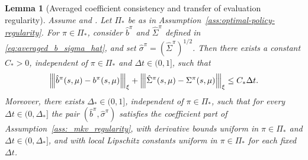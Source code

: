 \documentclass[a4paper, 10pt, english, reqno]{amsart}
\newcommand{\tnorm}[1]{\left\vert\kern-0.25ex\left\vert\kern-0.25ex\left\vert #1
\right\vert\kern-0.25ex\right\vert\kern-0.25ex\right\vert}
\newtheorem{lemma}[theorem]{Lemma}
\begin{document}
\begin{lemma}[Averaged coefficient consistency and transfer of evaluation regularity]
\label{lem:averaged-coeff-consistency-and-regularity-mkv}
Assume  and
. Let $\Pi_*$ be as in
Assumption~\ref{ass:optimal-policy-regularity}. For $\pi\in\Pi_*$,
consider $\hat b^\pi$ and $\hat\Sigma^\pi$ defined in
\eqref{eq:averaged_b_sigma_hat}, and set
$\hat\sigma^\pi=(\hat\Sigma^\pi)^{1/2}$. Then there exists a constant
$C_*>0$, independent of $\pi\in\Pi_*$ and $\Delta t\in(0,1]$, such that
\begin{equation}
\label{eq:averaged-b-error-mkv}
\tnorm{\hat b^\pi(s,\mu)-b^\pi(s,\mu)}_\xi
+\tnorm{\hat\Sigma^\pi(s,\mu)-\Sigma^\pi(s,\mu)}_\xi
\le C_*\Delta t.
\end{equation}
Moreover, there exists $\Delta_*\in(0,1]$, independent of $\pi\in\Pi_*$, such that for every $\Delta t\in(0,\Delta_*]$ the pair $(\hat b^\pi,\hat\sigma^\pi)$ satisfies the coefficient part of Assumption~\ref{ass:_mkv_regularity}, with derivative bounds uniform in
$\pi\in\Pi_*$ and $\Delta t\in(0,\Delta_*]$, and with local Lipschitz
constants uniform in $\pi\in\Pi_*$ for each fixed $\Delta t$.
\end{lemma}
\end{document}
